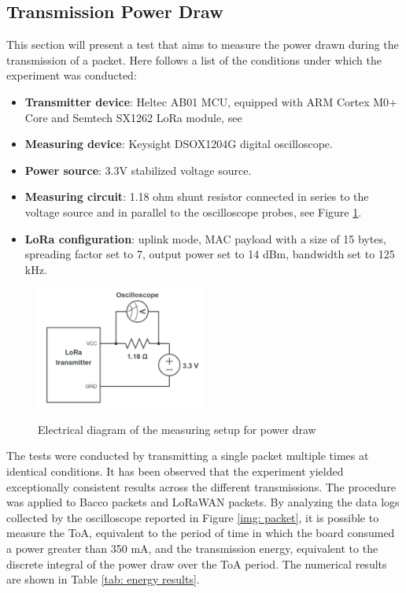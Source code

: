 \subsection{Transmission Power Draw}
This section will present a test that aims to measure the power drawn during the transmission of a packet.
Here follows a list of the conditions under which the experiment was conducted:
\begin{itemize}
    \item \textbf{Transmitter device}: Heltec AB01 MCU, equipped with ARM Cortex M0+ Core and Semtech SX1262 LoRa module,
        see \cite{ab01}
    \item \textbf{Measuring device}: Keysight DSOX1204G digital oscilloscope.
    \item \textbf{Power source}: 3.3V stabilized voltage source.
    \item \textbf{Measuring circuit}: 1.18 ohm shunt resistor connected in series to the voltage source
        and in parallel to the oscilloscope probes, see Figure \ref{img: measure setup}.
    \item \textbf{LoRa configuration}: uplink mode, MAC payload with a size of 15 bytes, spreading factor set to 7, output power
        set to 14 dBm, bandwidth set to 125 kHz.
\end{itemize}
\begin{figure}[ht]
    \centering
    \includegraphics[width=0.5\textwidth]{images/schematic.png}\\
    \caption{Electrical diagram of the measuring setup for power draw}
    \label{img: measure setup}
\end{figure}
The tests were conducted by transmitting a single packet multiple times at identical conditions. It has been observed
that the experiment yielded exceptionally consistent results across the different transmissions. The procedure was
applied to Bacco packets and LoRaWAN packets. By analyzing the data logs collected by the oscilloscope reported in
Figure \ref{img: packet}, it is possible to measure the \gls{ToA}, equivalent to the period of time in which the board
consumed a power greater than 350 mA, and the transmission energy, equivalent to the discrete integral of the power draw
over the \gls{ToA} period. The numerical results are shown in Table \ref{tab: energy results}.

